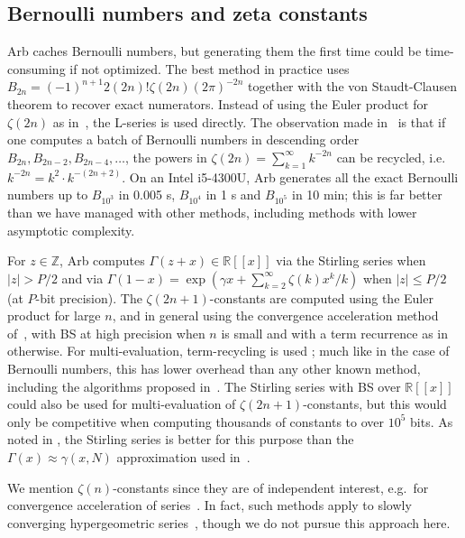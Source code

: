 \documentclass[11pt,a4paper]{article}
\begin{document}
\subsection{Bernoulli numbers and zeta constants}

Arb caches Bernoulli numbers, but generating them the first time
could be time-consuming if not optimized.
The best method in practice uses
$B_{2n} = (-1)^{n+1} 2(2n)! \zeta(2n) (2\pi)^{-2n}$
together with the von Staudt-Clausen theorem
to recover exact numerators.
Instead of using the Euler product for $\zeta(2n)$ as in~\cite{fillebrown1992faster},
the L-series is used directly.
The observation made in~\cite{bloemen}
is that if one computes a batch of Bernoulli numbers
in descending order $B_{2n}, B_{2n-2}, B_{2n-4}, \ldots$, the powers in
$\zeta(2n) = \sum_{k=1}^{\infty} k^{-2n}$
can be recycled, i.e.\ $k^{-2n} = k^2 \cdot k^{-(2n+2)}$.
On an Intel i5-4300U, Arb generates all the exact Bernoulli
numbers up to $B_{10^3}$ in 0.005 s,
$B_{10^4}$ in 1 s and $B_{10^5}$ in 10 min;
this is far better than
we have managed with other
methods, including methods with lower asymptotic complexity.

For $z \in \mathbb{Z}$, Arb computes $\Gamma(z+x) \in \mathbb{R}[[x]]$ via the Stirling series
when $|z| > P / 2$ and via
$\Gamma(1-x) = \exp\left(\gamma x + \sum_{k=2}^\infty \zeta(k) x^{k} / k \right)$
when $|z| \le P / 2$ (at $P$-bit precision).
The $\zeta(2n+1)$-constants are computed using the Euler product for large $n$,
and in general using the convergence acceleration method of~\cite{Borwein2000},
with BS at high precision when $n$ is small and with a term recurrence as in~\cite{mpfralg}
otherwise. For multi-evaluation, term-recycling is used \cite[Algorithm~4.7.1]{Johansson2014thesis};
much like in the case of Bernoulli numbers, this
has lower overhead than any other known method, including the algorithms proposed in~\cite{BorweinBradleyCrandall2000}.
The Stirling series with BS over $\mathbb{R}[[x]]$ could also be used
for multi-evaluation of $\zeta(2n+1)$-constants,
but this would only be competitive when computing thousands of constants
to over $10^5$ bits. As noted in \cite{Johansson2014thesis}, the Stirling series is better
for this purpose than
the $\Gamma(x) \approx \gamma(x,N)$ approximation
used in~\cite{Karatsuba1998,BorweinBradleyCrandall2000}.

We mention $\zeta(n)$-constants since they are of independent interest,
e.g.\ for convergence acceleration of series~\cite{flajolet1996zeta}.
In fact, such methods apply to slowly converging hypergeometric series~\cite{bogolubsky2006fast,skorokhodov2005method},
though we do not pursue this approach here.
\end{document}

